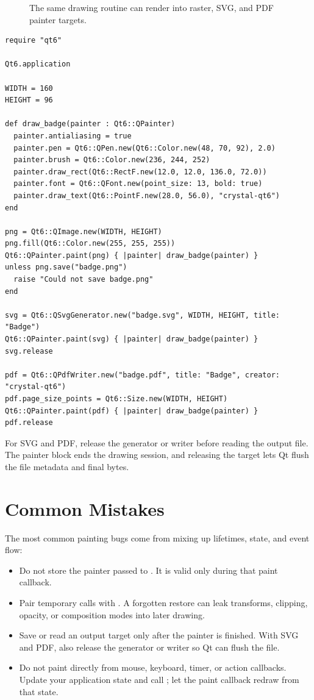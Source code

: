 \begin{figure}[htbp]
  \centering
  \caption{The same drawing routine can render into raster, SVG, and PDF painter targets.}
\end{figure}

\begin{lstlisting}[style=crystal]
require "qt6"

Qt6.application

WIDTH = 160
HEIGHT = 96

def draw_badge(painter : Qt6::QPainter)
  painter.antialiasing = true
  painter.pen = Qt6::QPen.new(Qt6::Color.new(48, 70, 92), 2.0)
  painter.brush = Qt6::Color.new(236, 244, 252)
  painter.draw_rect(Qt6::RectF.new(12.0, 12.0, 136.0, 72.0))
  painter.font = Qt6::QFont.new(point_size: 13, bold: true)
  painter.draw_text(Qt6::PointF.new(28.0, 56.0), "crystal-qt6")
end

png = Qt6::QImage.new(WIDTH, HEIGHT)
png.fill(Qt6::Color.new(255, 255, 255))
Qt6::QPainter.paint(png) { |painter| draw_badge(painter) }
unless png.save("badge.png")
  raise "Could not save badge.png"
end

svg = Qt6::QSvgGenerator.new("badge.svg", WIDTH, HEIGHT, title: "Badge")
Qt6::QPainter.paint(svg) { |painter| draw_badge(painter) }
svg.release

pdf = Qt6::QPdfWriter.new("badge.pdf", title: "Badge", creator: "crystal-qt6")
pdf.page_size_points = Qt6::Size.new(WIDTH, HEIGHT)
Qt6::QPainter.paint(pdf) { |painter| draw_badge(painter) }
pdf.release
\end{lstlisting}

For SVG and PDF, release the generator or writer before reading the output file. The painter block ends the drawing session, and releasing the target lets Qt flush the file metadata and final bytes.

\section{Common Mistakes}

The most common painting bugs come from mixing up lifetimes, state, and event flow:

\begin{itemize}
\item Do not store the painter passed to . It is valid only during that paint callback.
\item Pair temporary  calls with . A forgotten restore can leak transforms, clipping, opacity, or composition modes into later drawing.
\item Save or read an output target only after the painter is finished. With SVG and PDF, also release the generator or writer so Qt can flush the file.
\item Do not paint directly from mouse, keyboard, timer, or action callbacks. Update your application state and call ; let the paint callback redraw from that state.
\end{itemize}

